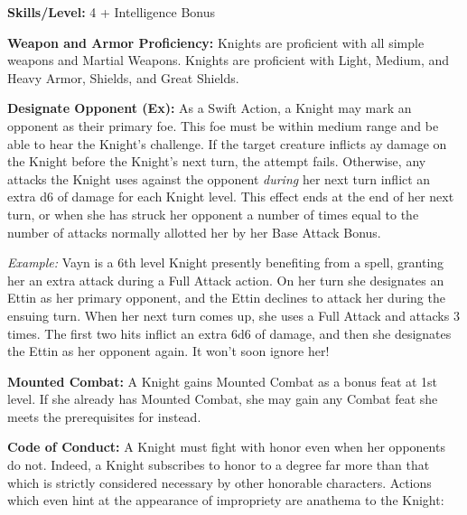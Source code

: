 \textbf{Skills/Level:} 4 + Intelligence Bonus

\goodbab{}
\poorfor{}
\poorref{}
\goodwil{}

\begin{classtable}
\end{classtable}

\classfeatures

\textbf{Weapon and Armor Proficiency:} Knights are proficient with all simple weapons and Martial Weapons. Knights are proficient with Light, Medium, and Heavy Armor, Shields, and Great Shields.

\textbf{Designate Opponent (Ex):} As a Swift Action, a Knight may mark an opponent as their primary foe. This foe must be within medium range and be able to hear the Knight's challenge. If the target creature inflicts ay damage on the Knight before the Knight's next turn, the attempt fails. Otherwise, any attacks the Knight uses against the opponent \textit{during} her next turn inflict an extra d6 of damage for each Knight level. This effect ends at the end of her next turn, or when she has struck her opponent a number of times equal to the number of attacks normally allotted her by her Base Attack Bonus.

\textit{Example:} Vayn is a 6th level Knight presently benefiting from a  spell, granting her an extra attack during a Full Attack action. On her turn she designates an Ettin as her primary opponent, and the Ettin declines to attack her during the ensuing turn. When her next turn comes up, she uses a Full Attack and attacks 3 times. The first two hits inflict an extra 6d6 of damage, and then she designates the Ettin as her opponent again. It won't soon ignore her!

\textbf{Mounted Combat:} A Knight gains Mounted Combat as a bonus feat at 1st level. If she already has Mounted Combat, she may gain any Combat feat she meets the prerequisites for instead.

\textbf{Code of Conduct:} A Knight must fight with honor even when her opponents do not. Indeed, a Knight subscribes to honor to a degree far more than that which is strictly considered necessary by other honorable characters. Actions which even hint at the appearance of impropriety are anathema to the Knight:

